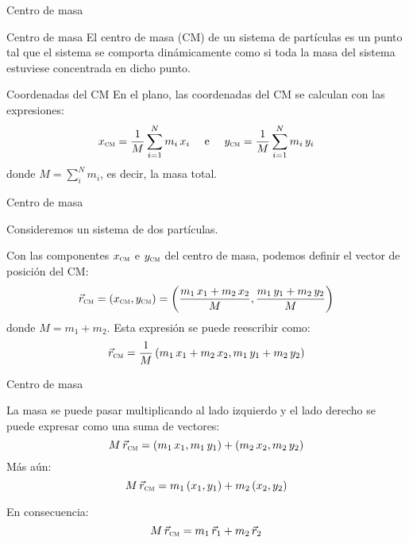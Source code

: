 \documentclass[11pt,handout,aspectratio=1610]{beamer}
\begin{document}

\begin{frame}{Centro de masa}
    
    \begin{block}{Centro de masa}
        El centro de masa (CM) de un sistema de partículas es un punto tal que el sistema se comporta dinámicamente como si toda la masa del sistema estuviese concentrada en dicho punto.
    \end{block} \pause

    \begin{block}{Coordenadas del CM}
        En el plano, las coordenadas del CM se calculan con las expresiones:
        $$x_{\textsc{cm}} = \frac{1}{M} \sum\limits_{i=1}^N m_i \, x_i \quad \text{ e } \quad y_{\textsc{cm}} = \frac{1}{M} \sum\limits_{i=1}^N m_i \, y_i$$ donde $M = \sum\limits_{i}^N m_i$, es decir, la masa total.
    \end{block}
    
\end{frame}

\begin{frame}{Centro de masa}

    Consideremos un sistema de dos partículas.

    \vspace{11pt}

    Con las componentes $x_{\textsc{cm}}$ e $y_{\textsc{cm}}$ del centro de masa, podemos definir el vector de posición del CM: $$\vec{r}_{\textsc{cm}} = \left(x_{\textsc{cm}},y_{\textsc{cm}}\right) = \left(\frac{m_1 \, x_1 + m_2 \, x_2}{M}, \frac{m_1 \, y_1 + m_2 \, y_2}{M}\right)$$ donde $M = m_1 + m_2$. \pause Esta expresión se puede reescribir como: $$\vec{r}_{\textsc{cm}} = \frac{1}{M} \left(m_1 \, x_1 + m_2 \, x_2, m_1 \, y_1 + m_2 \, y_2\right)$$
    
\end{frame}

\begin{frame}{Centro de masa}

    La masa se puede pasar multiplicando al lado izquierdo y el lado derecho se puede expresar como una suma de vectores: $$M \, \vec{r}_{\textsc{cm}} = \left(m_1 \, x_1, m_1 \, y_1\right) + \left(m_2 \, x_2, m_2 \, y_2 \right)$$ \pause Más aún: $$M \, \vec{r}_{\textsc{cm}} = m_1 \left(x_1,y_1\right) + m_2 \left(x_2,y_2\right)$$ \pause 
    \vspace{-0.5cm}
    \begin{block}{En consecuencia:} 
        \vspace{-0.3cm}
        $$M \, \vec{r}_{\textsc{cm}} = m_1 \, \vec{r}_1 + m_2 \, \vec{r}_2$$
    \end{block}

\end{frame}
\end{document}
